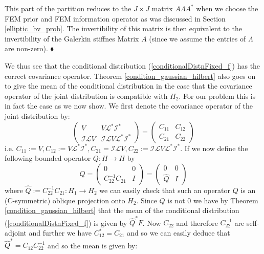 \begin{remark}
    This part of the partition reduces to the $J\times J$ matrix $A\Lambda A^{*}$ when we choose the FEM prior and FEM information operator as was discussed in Section \textcolor{blue}{\ref{elliptic_bv_prob}}. The invertibility of this matrix is then equivalent to the invertibility of the Galerkin stiffnes Matrix $A$ (since we assume the entries of $\Lambda$ are non-zero). $\mathbin{\blacklozenge}$
\end{remark}
We thus see that the conditional distribution (\ref{conditionalDistnFixed_f}) has the correct covariance operator. Theorem \textcolor{blue}{\ref{condition_gaussian_hilbert}} also goes on to give the mean of the conditional distribution in the case that the covariance operator of the joint distribution is compatible with $H_{2}$. For our problem this is in fact the case as we now show. We first denote the covariance operator of the joint distribution by:
\begin{equation*}
    \begin{pmatrix}
        V & V\mathcal{L}^{*}\mathcal{I}^{*} \\
        \mathcal{I}\mathcal{L}V & \mathcal{I}\mathcal{L}V\mathcal{L}^{*}\mathcal{I}^{*}
    \end{pmatrix}=
    \begin{pmatrix}
        C_{11} & C_{12} \\
        C_{21} & C_{22}
    \end{pmatrix}
\end{equation*}
i.e. $C_{11}:=V, C_{12}:=V\mathcal{L}^{*}\mathcal{I}^{*},C_{21}=\mathcal{I}\mathcal{L}V,C_{22}:=\mathcal{I}\mathcal{L}V\mathcal{L}^{*}\mathcal{I}^{*}$. If we now define the following bounded operator $Q:H\rightarrow H$ by
\begin{equation*}
    Q = \begin{pmatrix}
            0 & 0 \\
            C_{22}^{-1}C_{21} & I
        \end{pmatrix} =
        \begin{pmatrix}
            0 & 0 \\
            \hat{Q} & I
        \end{pmatrix}
\end{equation*}
where $\hat{Q}:=C_{22}^{-1}C_{21}:H_{1}\rightarrow H_{2}$ we can easily check that such an operator $Q$ is an (C-symmetric) oblique projection onto $H_{2}$. Since $Q$ is not $0$ we have by Theorem \textcolor{blue}{\ref{condition_gaussian_hilbert}} that the mean of the conditional distribution (\ref{conditionalDistnFixed_f}) is given by $\hat{Q}^{*}F$. Now $C_{22}$ and therefore $C_{22}^{-1}$ are self-adjoint and further we have $C_{12}^{*}=C_{21}$ and so we can easily deduce that $\hat{Q}^{*}=C_{12}C_{22}^{-1}$ and so the mean is given by:
